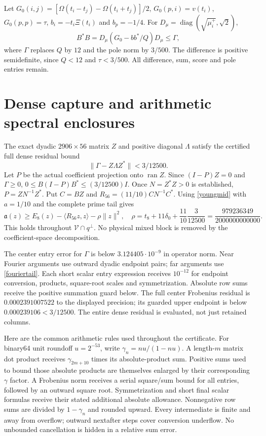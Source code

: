 \documentclass[11pt]{article}
\newcommand{\Ran}{\operatorname{ran}}
\numberwithin{equation}{section}
\begin{document}
Let $G_0(i,j)=[\Omega(t_i-t_j)-\Omega(t_i+t_j)]/2$,
$G_0(p,i)=v(t_i)$, $G_0(p,p)=\tau$,
$b_i=-t_i\Xi(t_i)$ and $b_p=-1/4$.
For $D_\mu=\operatorname{diag}(\sqrt{\mu_i^+},\sqrt2)$,
\[
 B^*B=D_\mu(G_0-bb^*/Q)D_\mu\le\Gamma,
\]
where $\Gamma$ replaces $Q$ by $12$ and the pole norm by $3/500$.
The difference is positive semidefinite, since $Q<12$ and
$\tau<3/500$. All difference, sum, score and pole entries remain.

\section{Dense capture and arithmetic spectral enclosures}\label{capture}
The exact dyadic $2906\times56$ matrix $Z$ and positive diagonal
$\Lambda$ satisfy the certified full dense residual bound
\[
 \|\Gamma-Z\Lambda Z^*\|<3/12500.
\]
Let $P$ be the actual coefficient projection onto $\Ran Z$. Since
$(I-P)Z=0$ and $\Gamma\ge0$,
$0\le B(I-P)B^*\le(3/12500)I$. Once $N=Z^*Z>0$ is established,
$P=ZN^{-1}Z^*$. Put $C=BZ$ and $R_{56}=(11/10)CN^{-1}C^*$.
Using \eqref{youngmid} with $a=1/10$ and the complete prime tail gives
\begin{equation}\label{rest}
 \mathfrak a(z)\ge E_8(z)-\langle R_{56}z,z\rangle-\rho\|z\|^2,
 \quad \rho=t_8+11\delta_0+\frac{11}{10}\frac3{12500}
       =\frac{979236349}{2000000000000}.
\end{equation}
This holds throughout $\mathcal V\cap q^\perp$. No physical mixed
block is removed by the coefficient-space decomposition.

The center entry error for $\Gamma$ is below
$3.124405\cdot10^{-9}$ in operator norm. Near Fourier arguments use
outward dyadic endpoint pairs; far arguments use \eqref{fouriertail}.
Each short scalar entry expression receives $10^{-12}$ for endpoint
conversion, products, square-root scales and symmetrization. Absolute
row sums receive the positive summation guard below. The full center
Frobenius residual is $0.0002391007522$ to the displayed precision;
its guarded upper endpoint is below $0.000239106<3/12500$.
The entire dense residual is evaluated, not just retained columns.

Here are the common arithmetic rules used throughout the certificate.
For binary64 unit roundoff $u=2^{-53}$, write
$\gamma_n=nu/(1-nu)$. A length-$m$ matrix dot product receives
$\gamma_{2m+10}$ times its absolute-product sum. Positive sums used
to bound those absolute products are themselves enlarged by their
corresponding $\gamma$ factor. A Frobenius norm receives a serial
square/sum bound for all entries, followed by an outward square root.
Symmetrization and short final scalar formulas receive their stated
additional absolute allowance. Nonnegative row sums are divided by
$1-\gamma_n$ and rounded upward. Every intermediate is finite and
away from overflow; outward nextafter steps cover conversion underflow.
No unbounded cancellation is hidden in a relative sum error.
\end{document}
